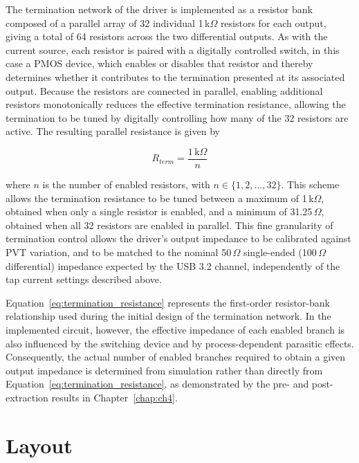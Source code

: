 The termination network of the driver is implemented as a resistor bank composed of a parallel array of 32 individual 1\,k$\Omega$ resistors for each output, giving a total of 64 resistors across the two differential outputs. As with the current source, each resistor is paired with a digitally controlled switch, in this case a PMOS device, which enables or disables that resistor and thereby determines whether it contributes to the termination presented at its associated output. Because the resistors are connected in parallel, enabling additional resistors monotonically reduces the effective termination resistance, allowing the termination to be tuned by digitally controlling how many of the 32 resistors are active. The resulting parallel resistance is given by

\begin{equation}
R_{term} = \frac{1\,\mathrm{k}\Omega}{n}
\label{eq:termination_resistance}
\end{equation}

where $n$ is the number of enabled resistors, with $n \in \{1, 2, \dots, 32\}$. This scheme allows the termination resistance to be tuned between a maximum of 1\,k$\Omega$, obtained when only a single resistor is enabled, and a minimum of 31.25\,$\Omega$, obtained when all 32 resistors are enabled in parallel. This fine granularity of termination control allows the driver's output impedance to be calibrated against \ac{PVT} variation, and to be matched to the nominal 50\,$\Omega$ single-ended (100\,$\Omega$ differential) impedance expected by the \ac{USB} 3.2 channel, independently of the tap current settings described above.

Equation~\ref{eq:termination_resistance} represents the first-order resistor-bank relationship used during the initial design of the termination network. In the implemented circuit, however, the effective impedance of each enabled branch is also influenced by the switching device and by process-dependent parasitic effects. Consequently, the actual number of enabled branches required to obtain a given output impedance is determined from simulation rather than directly from Equation~\ref{eq:termination_resistance}, as demonstrated by the pre- and post-extraction results in Chapter~\ref{chap:ch4}.

\section{Layout} \label{sec:layout}

